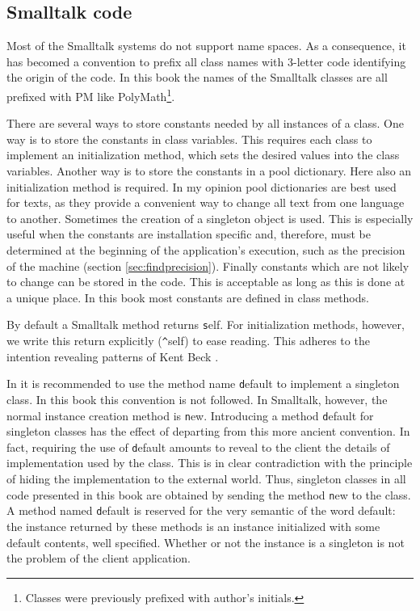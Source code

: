 \subsection{Smalltalk code}
Most of the Smalltalk systems do not support name spaces. As a
consequence, it has becomed a convention to prefix all class names
with 3-letter code identifying the origin of the code. In this
book the names of the Smalltalk classes are all prefixed with PM like PolyMath\footnote{Classes were previously prefixed with author's initials.}.

There are several ways to store constants needed by all instances
of a class. One way is to store the constants in class variables.
This requires each class to implement an initialization method,
which sets the desired values into the class variables. Another
way is to store the constants in a pool dictionary. Here also an
initialization method is required. In my opinion pool dictionaries
are best used for texts, as they provide a convenient way to
change all text from one language to another. Sometimes the
creation of a singleton object is used. This is especially useful
when the constants are installation specific and, therefore, must
be determined at the beginning of the application's execution,
such as the precision of the machine (\cf section
\ref{sec:findprecision}). Finally constants which are not likely
to change can be stored in the code. This is acceptable as long as
this is done at a unique place. In this book most constants are
defined in class methods.

By default a Smalltalk method returns {\texttt self}. For
initialization methods, however, we write this return explicitly
({\texttt \^\/self}) to ease reading. This adheres to the intention
revealing patterns of Kent Beck \cite{Beck}.

In \cite{StDesPat} it is recommended to use the method name {\texttt
default} to implement a singleton class. In this book this
convention is not followed. In Smalltalk, however, the normal
instance creation method is {\texttt new}. Introducing a method {\texttt
default} for singleton classes has the effect of departing from
this more ancient convention. In fact, requiring the use of {\texttt
default} amounts to reveal to the client the details of
implementation used by the class. This is in clear contradiction
with the principle of hiding the implementation to the external
world.
Thus, singleton classes in all code presented in this book
are obtained by sending the method {\texttt new} to the class.
A method named {\texttt default} is reserved for the very semantic of
the word default: the instance returned by these methods is an
instance initialized with some default contents, well specified.
Whether or not the instance is a singleton is not the problem of
the client application.

